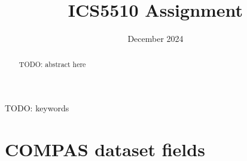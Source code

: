 \documentclass[conference]{IEEEtran}
\begin{document}
	
	\title{ICS5510 Assignment}
	
	\author{
		\date{December 2024}
		
	}
	
	\maketitle
	
	\begin{abstract}
	TODO: abstract here
	\end{abstract}
	
	\begin{IEEEkeywords}
		TODO: keywords
	\end{IEEEkeywords}
	
	
	
	
	
	
	
	
	
	
	
	
	
	
	
	
	
	
	
	
	
	
	
	
	
	
	
	
	
	
	
	
	
	
	
	
	
	
	
	
	
	

	
	

	


	
	
\printbibliography

\onecolumn
\pagebreak
\appendix 
\section{COMPAS dataset fields}
\end{document}
